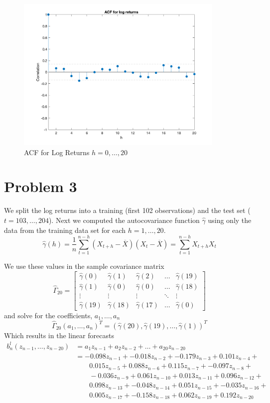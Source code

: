 \documentclass{article}
\begin{document}
\begin{figure}[H]
\includegraphics[width=10cm]{plots/acf_log_returns.png}
\centering
\caption{ACF for Log Returns $h = 0,\ldots, 20$}
\label{fig:acf_log}
\end{figure}

\section*{Problem 3}
We split the log returns into a training (first 102 observations) and the test set ($t = 103,\ldots, 204$).
Next we computed the autocovariance function $\hat{\gamma}$ using only the data from the training data set for each $h = 1,\ldots,20$.
$$
\hat{\gamma}(h) = \frac{1}{n} \sum_{t = 1}^{n - h}(X_{t + h} - \overline{X}) (X_t - \overline{X}) = \sum_{t = 1}^{n - h} X_{t + h} X_t
$$

We use these values in the sample covariance matrix
$$
\hat{\Gamma}_{20} = \begin{bmatrix}
    \hat{\gamma}(0)      & \hat{\gamma}(1) & \hat{\gamma}(2) & \dots & \hat{\gamma}(19) \\
    \hat{\gamma}(1)       & \hat{\gamma}(0) & \hat{\gamma}(0) & \dots & \hat{\gamma}(18) \\
    \vdots & \vdots & \vdots & \ddots & \vdots \\
    \hat{\gamma}(19)       & \hat{\gamma}(18) & \hat{\gamma}(17) & \dots & \hat{\gamma}(0)
\end{bmatrix}
$$
and solve for the coefficients, $a_1,\ldots, a_n$
$$
\hat{\Gamma}_{20} (a_1,\ldots, a_n)^T = (\hat{\gamma}(20), \hat{\gamma}(19),\ldots, \hat{\gamma}(1))^T
$$
Which results in the linear forecasts
\begin{align*}
b_n^l(z_{n-1}, \ldots, z_{n - 20}) &= a_1 z_{n - 1} + a_2 z_{n - 2} + \ldots + a_{20} z_{n - 20}\\
&= -0.098z_{n-1} + -0.018z_{n-2} + -0.179z_{n-3} + 0.101z_{n-4} + \\
&\qquad 0.015z_{n-5} + 0.088z_{n-6} + 0.115z_{n-7} + -0.097z_{n-8} +\\
&\qquad -0.036z_{n-9} + 0.061z_{n-10} + 0.013z_{n-11} + 0.096z_{n-12} +\\
&\qquad 0.098z_{n-13} + -0.048z_{n-14} + 0.051z_{n-15} + -0.035z_{n-16} +\\
&\qquad 0.005z_{n-17} + -0.158z_{n-18} + 0.062z_{n-19} + 0.192z_{n-20}
\end{align*}
\end{document}
